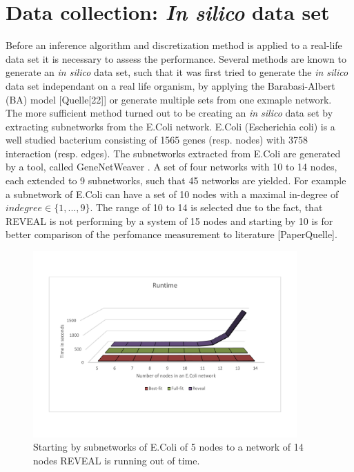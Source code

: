 \newpage
\section{Data collection: \textit{In silico} data set}


Before an inference algorithm and discretization method is applied to a real-life data set it is necessary to assess the performance.  Several methods are known to generate an \textit{in silico} data set, such that it was first tried to generate the \textit{in silico} data set independant on a real life organism, by applying the Barabasi-Albert (BA) model [Quelle[22]] or generate multiple sets from one exmaple network.\\
The more sufficient method turned out to be creating an \textit{in silico} data set by extracting subnetworks from the E.Coli network. E.Coli (Escherichia coli) is a well studied bacterium consisting of 1565 genes (resp. nodes) with 3758 interaction (resp. edges). The subnetworks extracted from E.Coli are generated by a tool, called GeneNetWeaver 
. A set of four networks with 10 to 14 nodes, each extended to 9 subnetworks, such that 45 networks are yielded. For example a subnetwork of E.Coli can have a set of 10 nodes with a maximal in-degree of $indegree\in\{1,...,9\}$. The range of 10 to 14 is selected due to the fact, that REVEAL is not performing by a system of 15 nodes and starting by 10 is for better comparison of the perfomance measurement to literature [PaperQuelle].

\begin{figure}[H]
\captionsetup{width=0.8\linewidth}
\centering
\includegraphics[width=0.9\textwidth]{./Bilder/Scoring/insilico/1_Indegree_Runtime/Runtime_nodes.pdf}
\caption[Runtime of Boolean Network Inference algorithms]{Starting by subnetworks of E.Coli of 5 nodes to a network of 14 nodes REVEAL is running out of time.}
\label{fig:}
\end{figure}

